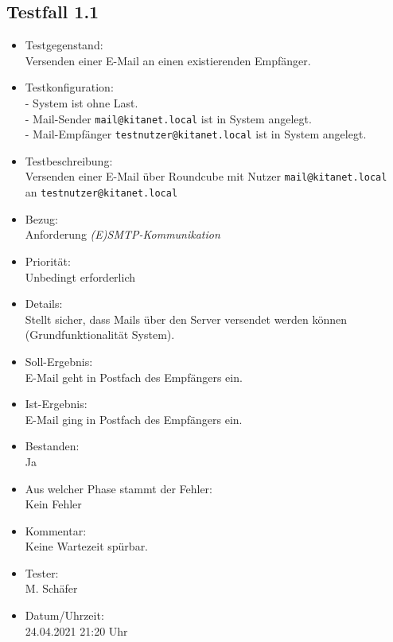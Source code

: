 \subsection{Testfall 1.1}
\begin{itemize}
	\item Testgegenstand:\\
	Versenden einer E-Mail an einen existierenden Empfänger.
	\item Testkonfiguration:\\
	- System ist ohne Last.\\
	- Mail-Sender \verb+mail@kitanet.local+ ist in System angelegt.\\
	- Mail-Empfänger \verb+testnutzer@kitanet.local+ ist in System angelegt.
	\item Testbeschreibung:\\
	Versenden einer E-Mail über Roundcube mit Nutzer \verb+mail@kitanet.local+ \\ an \verb+testnutzer@kitanet.local+
	\item Bezug:\\
	Anforderung \textit{(E)SMTP-Kommunikation}
	\item Priorität:\\
	Unbedingt erforderlich
	\item Details:\\
	Stellt sicher, dass Mails über den Server versendet werden können (Grundfunktionalität System).
	\item Soll-Ergebnis:\\
	E-Mail geht in Postfach des Empfängers ein.
	\item Ist-Ergebnis:\\
	E-Mail ging in Postfach des Empfängers ein.
	\item Bestanden:\\
	Ja
	\item Aus welcher Phase stammt der Fehler:\\
	Kein Fehler
	\item Kommentar:\\
	Keine Wartezeit spürbar.
	\item Tester:\\
	M. Schäfer
	\item Datum/Uhrzeit:\\
	24.04.2021 21:20 Uhr
\end{itemize}

